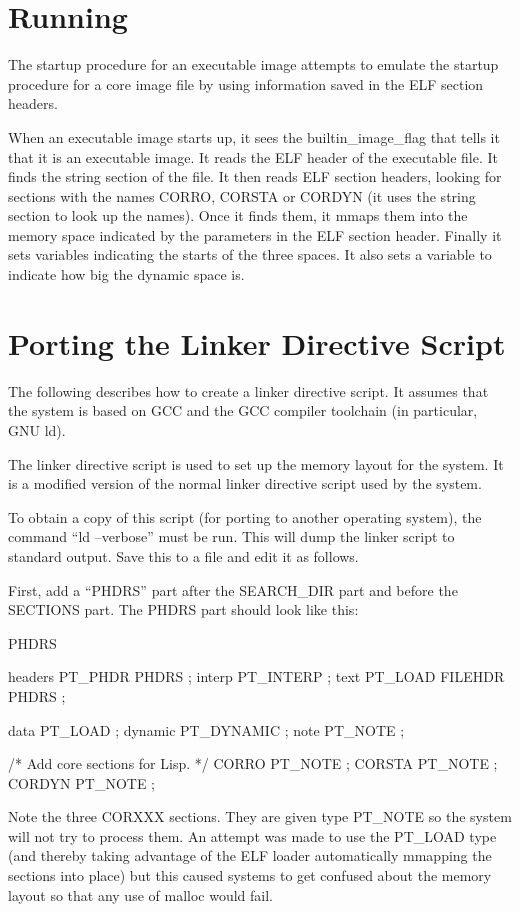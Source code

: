 \section{Running}
The startup procedure for an executable image attempts to emulate the startup procedure for a
core image file by using information saved in the ELF section headers.

When an executable image starts up, it sees the builtin_image_flag that tells it that it is an
executable image.  It reads the ELF header of the executable file.  It finds the string section
of the file.  It then reads ELF section headers, looking for sections with the names CORRO,
CORSTA or CORDYN (it uses the string section to look up the names).  Once it finds them, it
mmaps them into the memory space indicated by the parameters in the ELF section header.
Finally it sets variables indicating the starts of the three spaces.  It also sets a variable
to indicate how big the dynamic space is.

\section{Porting the Linker Directive Script}
The following describes how to create a linker directive script.  It assumes that the system is
based on GCC and the GCC compiler toolchain (in particular, GNU ld).

The linker directive script is used to set up the memory layout for the system.  It is a
modified version of the normal linker directive script used by the system.

To obtain a copy of this script (for porting to another operating system), the command ``ld
--verbose'' must be run.  This will dump the linker script to standard output.  Save this to a
file and edit it as follows.

First, add a ``PHDRS'' part after the SEARCH_DIR part and before the SECTIONS part.  The PHDRS
part should look like this:

PHDRS
{
	headers PT_PHDR PHDRS ;
	interp PT_INTERP ;
	text PT_LOAD FILEHDR PHDRS ;

	data PT_LOAD ;
	dynamic PT_DYNAMIC ;
        note PT_NOTE ;

	/* Add core sections for Lisp. */
	CORRO	PT_NOTE ;
	CORSTA	PT_NOTE ;
        CORDYN	PT_NOTE ;
}


Note the three CORXXX sections.  They are given type PT_NOTE so the system will not try to
process them.  An attempt was made to use the PT_LOAD type (and thereby taking advantage of the
ELF loader automatically mmapping the sections into place) but this caused systems to get
confused about the memory layout so that any use of malloc would fail.

